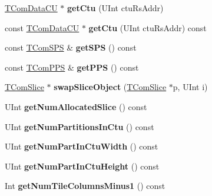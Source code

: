 \begin{DoxyCompactItemize}
\mbox{\label{class_t_com_pic_sym_a61309d94cab1e82808a564df077850f9}} 
\hyperlink{class_t_com_data_c_u}{T\+Com\+Data\+CU} $\ast$ {\bfseries get\+Ctu} (U\+Int ctu\+Rs\+Addr)
\item 
\mbox{\label{class_t_com_pic_sym_a87c56a719ebc23eff2aa042bf243872b}} 
const \hyperlink{class_t_com_data_c_u}{T\+Com\+Data\+CU} $\ast$ {\bfseries get\+Ctu} (U\+Int ctu\+Rs\+Addr) const
\item 
\mbox{\label{class_t_com_pic_sym_a4b4620ea49f6171aaedf4e9a67195616}} 
const \hyperlink{class_t_com_s_p_s}{T\+Com\+S\+PS} \& {\bfseries get\+S\+PS} () const
\item 
\mbox{\label{class_t_com_pic_sym_a8353abb2d23b38af6ca904cfc2395131}} 
const \hyperlink{class_t_com_p_p_s}{T\+Com\+P\+PS} \& {\bfseries get\+P\+PS} () const
\item 
\mbox{\label{class_t_com_pic_sym_a2ae06008b52129e91645abdfca0767d7}} 
\hyperlink{class_t_com_slice}{T\+Com\+Slice} $\ast$ {\bfseries swap\+Slice\+Object} (\hyperlink{class_t_com_slice}{T\+Com\+Slice} $\ast$p, U\+Int i)
\item 
\mbox{\label{class_t_com_pic_sym_ac667fac380d6aacb6895bbbd91406219}} 
U\+Int {\bfseries get\+Num\+Allocated\+Slice} () const
\item 
\mbox{\label{class_t_com_pic_sym_a5cc294479f1fd3031af31692d35d9622}} 
U\+Int {\bfseries get\+Num\+Partitions\+In\+Ctu} () const
\item 
\mbox{\label{class_t_com_pic_sym_a6a138d3c1aed9cb8891ef18f540d8eda}} 
U\+Int {\bfseries get\+Num\+Part\+In\+Ctu\+Width} () const
\item 
\mbox{\label{class_t_com_pic_sym_a797d4b33da3ab712b0e21834acdc2bd4}} 
U\+Int {\bfseries get\+Num\+Part\+In\+Ctu\+Height} () const
\item 
\mbox{\label{class_t_com_pic_sym_a1a8b95b7e518fadf90974f4ff135c2b6}} 
Int {\bfseries get\+Num\+Tile\+Columns\+Minus1} () const

\end{DoxyCompactItemize}
